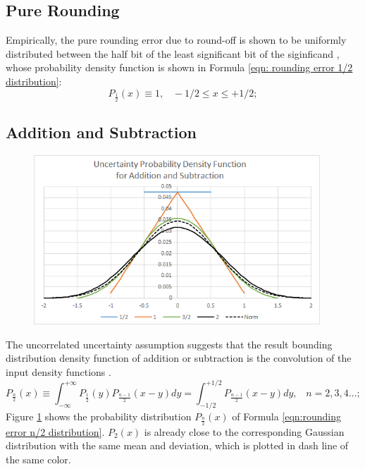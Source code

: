 \documentclass[twoside]{article}
\numberwithin{equation}{section}
\newcommand{\eqspace}{\;\;\;}
\begin{document}
\subsection{Pure Rounding}

Empirically, the pure rounding error due to round-off is shown to be uniformly distributed between the half bit of the least significant bit of the siginficand \cite{Prev_Precision_Arithmetic}, whose probability density function is shown in Formula \eqref{eqn: rounding error 1/2 distribution}:
\begin{equation}
\label{eqn: rounding error 1/2 distribution}
P_{\frac{1}{2}}(x) \equiv 1, \eqspace  -1/2 \leq x \leq +1/2; 
\end{equation}



\subsection{Addition and Subtraction  \cite{Prev_Precision_Arithmetic}}

\begin{figure}
\centering
\includegraphics[height=2.5in]{Prec_Add_ErrDist.png} 
\label{fig: Prec_Add_Err_Dist}
\end{figure}


The uncorrelated uncertainty assumption suggests that the result bounding distribution density function of addition or subtraction is the convolution of the input density functions \cite{Probability_Statistics}.  
\begin{equation}
\label{eqn:rounding error n/2 distribution}
P_{\frac{n}{2}}(x) \equiv \int _{-\infty}^{+\infty}P_{\frac{1}{2}}(y)P_{\frac{n-1}{2}}(x-y)dy=\int _{-1/2}^{+1/2}P_{\frac{n-1}{2}}(x-y) dy,\eqspace n=2,3,4\dots;
\end{equation}
Figure \ref{fig: Prec_Add_Err_Dist} shows the probability distribution $P_{\frac{n}{2}}(x)$ of Formula \eqref{eqn:rounding error n/2 distribution}.  
$P_{2}(x)$ is already close to the corresponding Gaussian distribution with the same mean and deviation, which is plotted in dash line of the same color.
\end{document}
